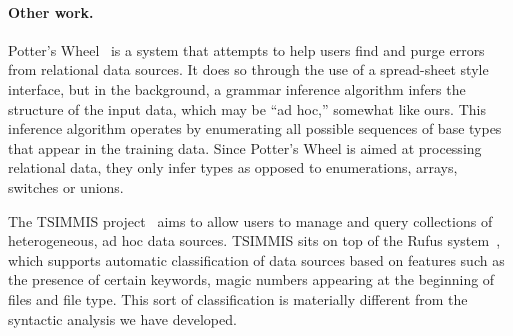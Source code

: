 \paragraph*{Other work.}
Potter's Wheel~\cite{raman+:potterwheel} is a system that attempts to
help users find and purge errors from
relational data sources.  It does so through the use of a spread-sheet
style interface, but in the background, a grammar inference algorithm
infers the structure of the input data, which may be ``ad hoc,'' 
somewhat like ours.  This inference algorithm operates by
enumerating all possible sequences of base types that appear
in the training data.  
Since Potter's Wheel is aimed at processing
relational data, they only infer  types
as opposed to enumerations, arrays, switches or unions.  

The TSIMMIS project~\cite{chawathe+:tsimmis} aims to
allow users to manage and query collections of heterogeneous, ad hoc
data sources.  TSIMMIS sits on top of the Rufus
system~\cite{shoens+:rufus}, which supports automatic classification
of data sources based on features such as the presence of certain
keywords, magic numbers appearing at the beginning of files and file
type.  
This sort of classification is materially
different from the syntactic analysis we have developed.
